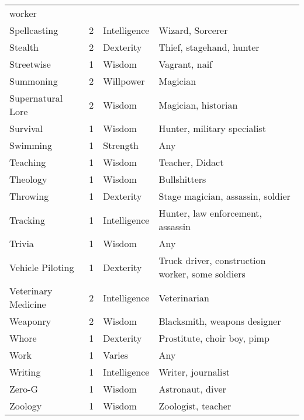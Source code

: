 \documentclass[twoside]{book}
\begin{document}
\begin{longtable}{p{1.25in}llp{12em}}
           worker \tabularnewline
      \raggedright Spellcasting & 2 & Intelligence & Wizard, Sorcerer \tabularnewline
      \raggedright Stealth & 2 & Dexterity & Thief, stagehand, hunter
           \tabularnewline
      \raggedright Streetwise & 1 & Wisdom & Vagrant, naif \tabularnewline
      \raggedright Summoning & 2 & Willpower & Magician \tabularnewline
      \raggedright Supernatural Lore & 2 & Wisdom & Magician, historian
           \tabularnewline
      \raggedright Survival & 1 & Wisdom & Hunter, military
           specialist \tabularnewline
      \raggedright Swimming & 1 & Strength & Any \tabularnewline
      \raggedright Teaching & 1 & Wisdom & Teacher, Didact \tabularnewline
      \raggedright Theology & 1 & Wisdom & Bullshitters \tabularnewline
      \raggedright Throwing & 1 & Dexterity & Stage magician, assassin,
           soldier \tabularnewline
      \raggedright Tracking & 1 & Intelligence & Hunter, law enforcement,
           assassin \tabularnewline
      \raggedright Trivia & 1 & Wisdom & Any \tabularnewline
      \raggedright Vehicle Piloting & 1 & Dexterity & Truck driver,
           construction worker, some soldiers \tabularnewline
      \raggedright Veterinary Medicine & 2 & Intelligence & Veterinarian \tabularnewline
      \raggedright Weaponry & 2 & Wisdom & Blacksmith, weapons
           designer \tabularnewline
      \raggedright Whore & 1 & Dexterity & Prostitute, choir boy,
           pimp \tabularnewline
      \raggedright Work & 1 & Varies & Any \tabularnewline
      \raggedright Writing & 1 & Intelligence & Writer, journalist
           \tabularnewline
      \raggedright Zero-G & 1 & Wisdom & Astronaut, diver \tabularnewline
      \raggedright Zoology & 1 & Wisdom & Zoologist, teacher
           \tabularnewline
      
\end{longtable}
    
\end{document}
